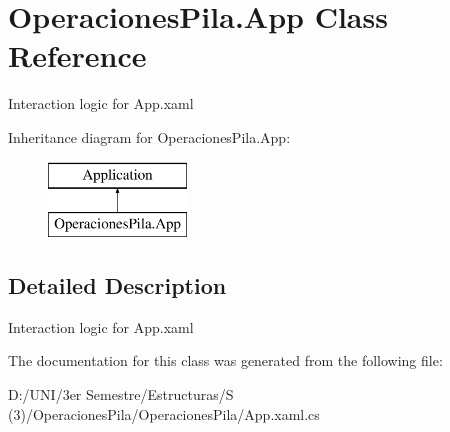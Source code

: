 \hypertarget{class_operaciones_pila_1_1_app}{}\section{Operaciones\+Pila.\+App Class Reference}
\label{class_operaciones_pila_1_1_app}


Interaction logic for App.\+xaml  


Inheritance diagram for Operaciones\+Pila.\+App\+:\begin{figure}[H]
\begin{center}
\leavevmode
\includegraphics[height=2.000000cm]{class_operaciones_pila_1_1_app}
\end{center}
\end{figure}


\subsection{Detailed Description}
Interaction logic for App.\+xaml 



The documentation for this class was generated from the following file\+:\begin{DoxyCompactItemize}
\item 
D\+:/\+U\+N\+I/3er Semestre/\+Estructuras/\+S (3)/\+Operaciones\+Pila/\+Operaciones\+Pila/App.\+xaml.\+cs\end{DoxyCompactItemize}
